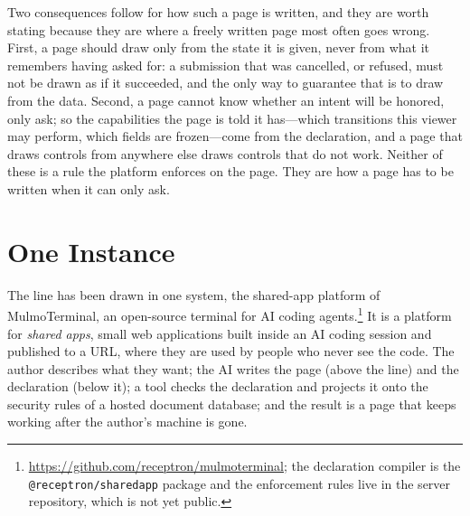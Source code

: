 \documentclass[11pt]{article}
\begin{document}
Two consequences follow for how such a page is written, and they are worth stating because they are where a freely written page most often goes wrong. First, a page should draw only from the state it is given, never from what it remembers having asked for: a submission that was cancelled, or refused, must not be drawn as if it succeeded, and the only way to guarantee that is to draw from the data. Second, a page cannot know whether an intent will be honored, only ask; so the capabilities the page is told it has---which transitions this viewer may perform, which fields are frozen---come from the declaration, and a page that draws controls from anywhere else draws controls that do not work. Neither of these is a rule the platform enforces on the page. They are how a page has to be written when it can only ask.

\section{One Instance}
\label{sec:instance}

The line has been drawn in one system, the shared-app platform of MulmoTerminal, an open-source terminal for AI coding agents.\footnote{\url{https://github.com/receptron/mulmoterminal}; the declaration compiler is the \texttt{@receptron/sharedapp} package and the enforcement rules live in the server repository, which is not yet public.} It is a platform for \emph{shared apps}, small web applications built inside an AI coding session and published to a URL, where they are used by people who never see the code. The author describes what they want; the AI writes the page (above the line) and the declaration (below it); a tool checks the declaration and projects it onto the security rules of a hosted document database; and the result is a page that keeps working after the author's machine is gone.
\end{document}
